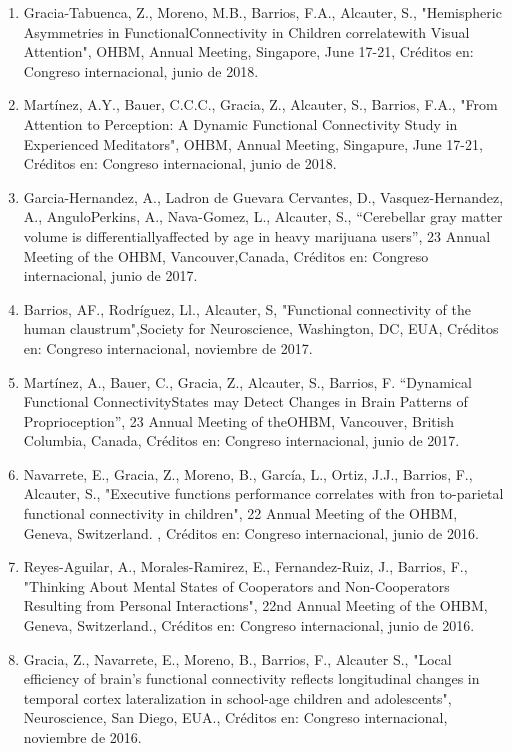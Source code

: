 \begin{enumerate}
\item Gracia-Tabuenca, Z., Moreno, M.B., Barrios, F.A., Alcauter, S., "Hemispheric Asymmetries in FunctionalConnectivity in 
Children correlatewith Visual Attention", OHBM, Annual Meeting, Singapore, June 17-21, Créditos en: Congreso internacional, 
junio de 2018.

\item Martínez, A.Y., Bauer, C.C.C., Gracia, Z., Alcauter, S., Barrios, F.A., "From Attention to Perception: A Dynamic 
Functional Connectivity Study in Experienced Meditators", OHBM, Annual Meeting, Singapure, June 17-21, Créditos en: 
Congreso internacional, junio de 2018.

\item Garcia-Hernandez, A., Ladron de Guevara Cervantes, D., Vasquez-Hernandez, A., AnguloPerkins, A., Nava-Gomez, L., 
Alcauter, S., “Cerebellar gray matter volume is differentiallyaffected by age in heavy marijuana users”, 23 Annual Meeting 
of the OHBM, Vancouver,Canada, Créditos en: Congreso internacional, junio de 2017.

\item Barrios, AF., Rodríguez, Ll., Alcauter, S, "Functional connectivity of the human claustrum",Society for Neuroscience, 
Washington, DC, EUA, Créditos en: Congreso internacional, noviembre de 2017.

\item Martínez, A., Bauer, C., Gracia, Z., Alcauter, S., Barrios, F. “Dynamical Functional ConnectivityStates may Detect 
Changes in Brain Patterns of Proprioception”, 23 Annual Meeting of theOHBM, Vancouver, British Columbia, Canada, Créditos 
en: Congreso internacional, junio de 2017.

\item Navarrete, E., Gracia, Z., Moreno, B., García, L., Ortiz, J.J., Barrios, F., Alcauter, S., "Executive functions 
performance correlates with fron to-parietal functional connectivity in children", 22 Annual Meeting of the OHBM, Geneva, 
Switzerland. , Créditos en: Congreso internacional, junio de 2016.

\item Reyes-Aguilar, A., Morales-Ramirez, E., Fernandez-Ruiz, J., Barrios, F., "Thinking About Mental States of Cooperators 
and Non-Cooperators Resulting from Personal Interactions", 22nd Annual Meeting of the OHBM, Geneva, Switzerland., Créditos 
en: Congreso internacional, junio de 2016.

\item Gracia, Z., Navarrete, E., Moreno, B., Barrios, F., Alcauter S., "Local efficiency of brain's functional connectivity 
reflects longitudinal changes in temporal cortex lateralization in school-age children and adolescents", Neuroscience, San 
Diego, EUA., Créditos en: Congreso internacional, noviembre de 2016.


\end{enumerate}
